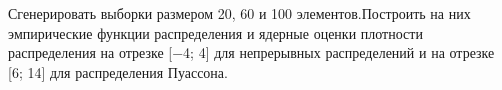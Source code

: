 \item Сгенерировать выборки размером 20, 60 и 100 элементов.\newline Построить на них эмпирические функции распределения и ядерные
    оценки плотности распределения на отрезке [−4; 4] для непрерывных распределений и на отрезке [6; 14] для распределения Пуассона.